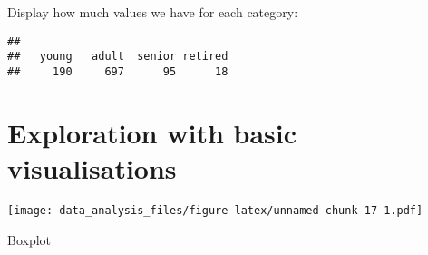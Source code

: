 \documentclass[
]{article}
\newenvironment{Shaded}{\begin{snugshade}}{\end{snugshade}}
\newcommand{\AttributeTok}[1]{\textcolor[rgb]{0.77,0.63,0.00}{#1}}
\newcommand{\ConstantTok}[1]{\textcolor[rgb]{0.00,0.00,0.00}{#1}}
\newcommand{\DecValTok}[1]{\textcolor[rgb]{0.00,0.00,0.81}{#1}}
\newcommand{\FunctionTok}[1]{\textcolor[rgb]{0.00,0.00,0.00}{#1}}
\newcommand{\NormalTok}[1]{#1}
\newcommand{\OtherTok}[1]{\textcolor[rgb]{0.56,0.35,0.01}{#1}}
\newcommand{\SpecialCharTok}[1]{\textcolor[rgb]{0.00,0.00,0.00}{#1}}
\newcommand{\StringTok}[1]{\textcolor[rgb]{0.31,0.60,0.02}{#1}}
\begin{document}
Display how much values we have for each category:

\begin{Shaded}
\end{Shaded}

\begin{verbatim}
## 
##   young   adult  senior retired 
##     190     697      95      18
\end{verbatim}

\hypertarget{exploration-with-basic-visualisations}{%
\section{Exploration with basic
visualisations}\label{exploration-with-basic-visualisations}}

\begin{Shaded}
\end{Shaded}

\texttt{[image: data\_analysis\_files/figure-latex/unnamed-chunk-17-1.pdf]}

Boxplot

\begin{Shaded}
\end{Shaded}
\end{document}
